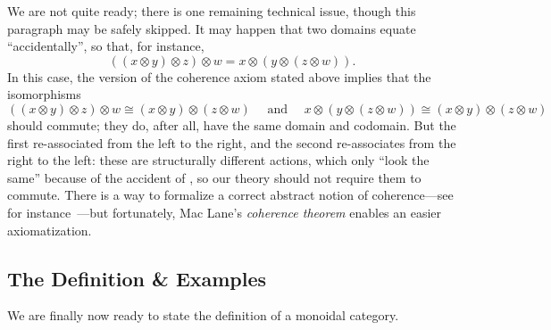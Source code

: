 We are not quite ready; there is one remaining technical issue, though this
paragraph may be safely skipped. It may happen that two
domains equate ``accidentally'', so that, for instance,
\begin{equation}\label{eqn:accidental equality}
  ((x\otimes y)\otimes z)\otimes w = x\otimes(y\otimes(z\otimes w)).
\end{equation}
In this case, the version of the coherence axiom stated above implies that the
isomorphisms \[
  ((x\otimes y)\otimes z)\otimes w \cong (x\otimes y)\otimes (z\otimes w)
  \quad\text{ and }\quad
  x\otimes(y\otimes(z\otimes w)) \cong (x\otimes y)\otimes (z\otimes w)
\] should commute; they do, after all, have the same domain and codomain. But
the first re-associated from the left to the right, and the second re-associates
from the right to the left: these are structurally different actions, which only
``look the same'' because of the accident of ,
so our theory should not require them to commute. There is a way to formalize
a correct abstract notion of coherence---see for instance~\cite[subsection
VII.2]{maclane-1971}---but fortunately, Mac Lane's \emph{coherence theorem}
enables an easier axiomatization.

\subsection{The Definition \& Examples}

We are finally now ready to state the definition of a monoidal category.

